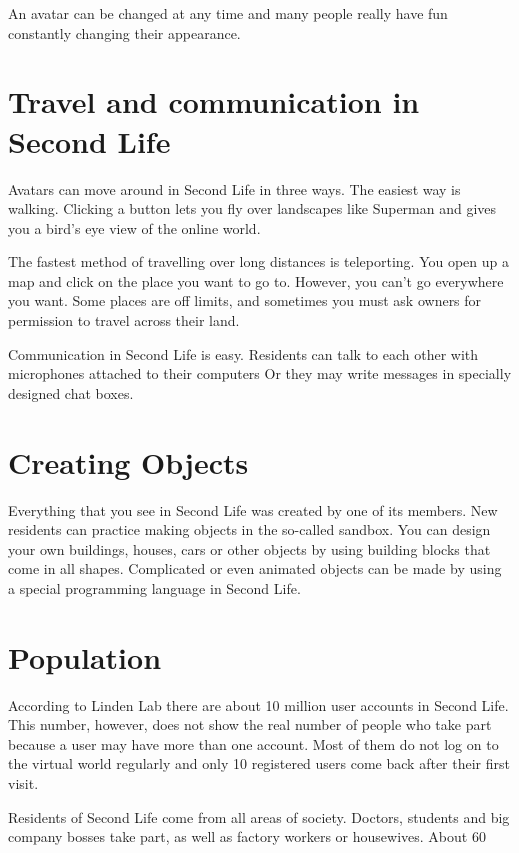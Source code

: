 \documentclass[a4paper,twocolumn]{article}
\begin{document}
An avatar can be changed at any time and many people really have fun
constantly changing their appearance. 

\section{Travel and communication in Second Life}

Avatars can move around in Second Life in three ways. The easiest way is
walking. Clicking a button lets you fly over landscapes like Superman
and gives you a bird’s eye view of the online world.

The fastest method of travelling over long distances is teleporting. You
open up a map and click on the place you want to go to. However, you
can’t go everywhere you want. Some places are off limits, and sometimes
you must ask owners for permission to travel across their land.

Communication in Second Life is easy. Residents can talk to each other
with microphones attached to their computers Or they may write messages
in specially designed chat boxes. 

\section{Creating Objects}

Everything that you see in Second Life was created by one of its
members. New residents can practice making objects in the so-called
sandbox. You can design your own buildings, houses, cars or other
objects by using building blocks that come in all shapes. Complicated
or even animated objects can be made by using a special programming
language in Second Life.

\section{Population}

According to Linden Lab there are about 10 million user accounts in
Second Life. This number, however, does not show the real number of
people who take part because a user may have more than one account. Most
of them do not log on to the virtual world regularly and only 10%
registered users come back after their first visit.

Residents of Second Life come from all areas of society. Doctors,
students and big company bosses take part, as well as factory workers or
housewives. About 60%
\end{document}
